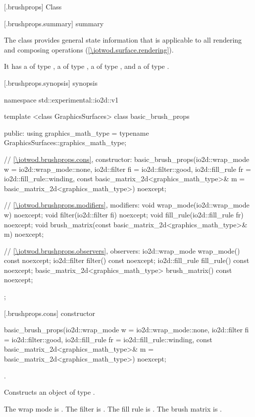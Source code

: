 
 [\iotwod.brushprops] {Class }

 [\iotwod.brushprops.summary] { summary}

\pnum
{}%
The  class provides general state information that is applicable to all rendering and composing operations (\ref{\iotwod.surface.rendering}).

\pnum
It has a  of type , a  of type , a  of type , and a  of type .

 [\iotwod.brushprops.synopsis] { synopsis}

\begin{codeblock}
namespace std::experimental::io2d::v1 {
  template <class GraphicsSurfaces>
  class basic_brush_props {
    public:
    using graphics_math_type = typename GraphicsSurfaces::graphics_math_type;

    // \ref{\iotwod.brushprops.cons}, constructor:
    basic_brush_props(io2d::wrap_mode w = io2d::wrap_mode::none,
      io2d::filter fi = io2d::filter::good,
      io2d::fill_rule fr = io2d::fill_rule::winding,
      const basic_matrix_2d<graphics_math_type>& m = basic_matrix_2d<graphics_math_type>{})
      noexcept;

    // \ref{\iotwod.brushprops.modifiers}, modifiers:
    void wrap_mode(io2d::wrap_mode w) noexcept;
    void filter(io2d::filter fi) noexcept;
    void fill_rule(io2d::fill_rule fr) noexcept;
    void brush_matrix(const basic_matrix_2d<graphics_math_type>& m) noexcept;

    // \ref{\iotwod.brushprops.observers}, observers:
    io2d::wrap_mode wrap_mode() const noexcept;
    io2d::filter filter() const noexcept;
    io2d::fill_rule fill_rule() const noexcept;
    basic_matrix_2d<graphics_math_type> brush_matrix() const noexcept;
  };
}
\end{codeblock}

 [\iotwod.brushprops.cons] { constructor}

%
\begin{itemdecl}
basic_brush_props(io2d::wrap_mode w = io2d::wrap_mode::none,
  io2d::filter fi = io2d::filter::good,
  io2d::fill_rule fr = io2d::fill_rule::winding,
  const basic_matrix_2d<graphics_math_type>& m = basic_matrix_2d<graphics_math_type>{})
  noexcept;
\end{itemdecl}
\begin{itemdescr}
\pnum
\requires
{}.

\pnum
\effects
Constructs an object of type .

\pnum
The wrap mode is . The filter is . The fill rule is . The brush matrix is .
\end{itemdescr}

